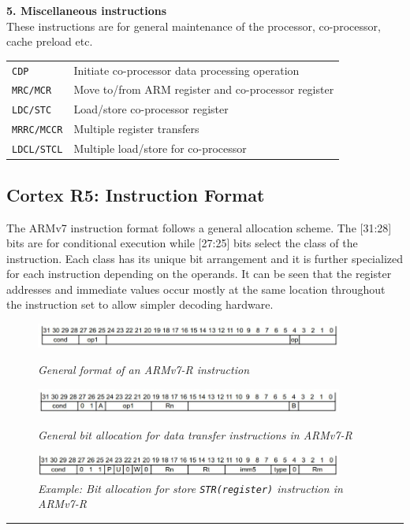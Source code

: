 \documentclass[a4paper,11pt]{article}
\begin{document}
\textbf{5. Miscellaneous instructions}\\
These instructions are for general maintenance of the processor, co-processor, cache preload etc.
\begin{center}
	\begin{tabular}{l l}
{\tt CDP} & Initiate co-processor data processing operation\\
{\tt MRC/MCR} & Move to/from ARM register and co-processor register\\
{\tt LDC/STC} & Load/store co-processor register\\
{\tt MRRC/MCCR} & Multiple register transfers\\
{\tt LDCL/STCL} & Multiple load/store for co-processor\\
\end{tabular}
\end{center}
\subsection{Cortex R5: Instruction Format}
The ARMv7 instruction format follows a general allocation scheme. The [31:28] bits are for conditional execution while [27:25] bits select the class of the instruction. Each class has its unique bit arrangement and it is further specialized for each instruction depending on the operands. It can be seen that the register addresses and immediate values occur mostly at the same location throughout the instruction set to allow simpler decoding hardware.
\begin{figure}[H]
\centering
\includegraphics[width=0.90\textwidth]{figures/CortexFormatGen.jpg}
\caption{{\small \textit{General format of an ARMv7-R instruction}}\cite{ARMref}}
\includegraphics[width=0.90\textwidth]{figures/CortexLDR.jpg}
\caption{{\small \textit{General bit allocation for data transfer instructions in ARMv7-R}}\cite{ARMref}}
\includegraphics[width=0.90\textwidth]{figures/CortexSTR.jpg}
\caption{{\small \textit{Example: Bit allocation for store {\tt STR(register)} instruction in ARMv7-R}}\cite{ARMref}}
\end{figure}
\vspace{1cm}\hrule
\end{document}
